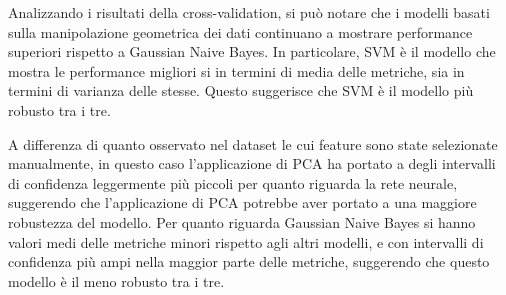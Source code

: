 Analizzando i risultati della cross-validation, si può notare che i modelli
basati sulla manipolazione geometrica dei dati continuano a mostrare performance
superiori rispetto a Gaussian Naive Bayes. In particolare, SVM è il modello che
mostra le performance migliori si in termini di media delle metriche, sia in
termini di varianza delle stesse. Questo suggerisce che SVM è il modello più
robusto tra i tre.

A differenza di quanto osservato nel dataset le cui feature sono state selezionate
manualmente, in questo caso l'applicazione di PCA ha portato a degli intervalli
di confidenza leggermente più piccoli per quanto riguarda la rete neurale, 
suggerendo che l'applicazione di PCA potrebbe aver portato a una maggiore
robustezza del modello.
Per quanto riguarda Gaussian Naive Bayes si hanno valori medi delle metriche
minori rispetto agli altri modelli, e con intervalli di confidenza più ampi
nella maggior parte delle metriche, suggerendo che questo modello è il meno
robusto tra i tre.
